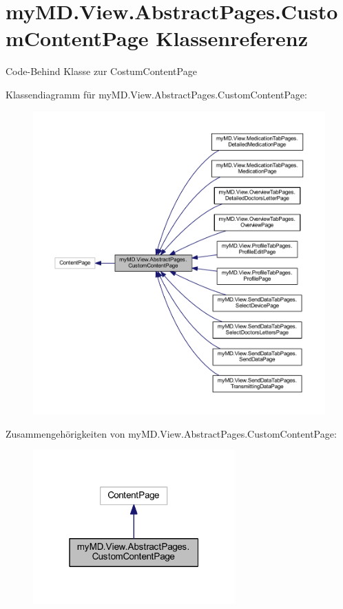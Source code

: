 \hypertarget{classmy_m_d_1_1_view_1_1_abstract_pages_1_1_custom_content_page}{}\section{my\+M\+D.\+View.\+Abstract\+Pages.\+Custom\+Content\+Page Klassenreferenz}
\label{classmy_m_d_1_1_view_1_1_abstract_pages_1_1_custom_content_page}


Code-\/\+Behind Klasse zur Costum\+Content\+Page  




Klassendiagramm für my\+M\+D.\+View.\+Abstract\+Pages.\+Custom\+Content\+Page\+:
\nopagebreak
\begin{figure}[H]
\begin{center}
\leavevmode
\includegraphics[width=350pt]{classmy_m_d_1_1_view_1_1_abstract_pages_1_1_custom_content_page__inherit__graph}
\end{center}
\end{figure}


Zusammengehörigkeiten von my\+M\+D.\+View.\+Abstract\+Pages.\+Custom\+Content\+Page\+:
\nopagebreak
\begin{figure}[H]
\begin{center}
\leavevmode
\includegraphics[width=220pt]{classmy_m_d_1_1_view_1_1_abstract_pages_1_1_custom_content_page__coll__graph}
\end{center}
\end{figure}
